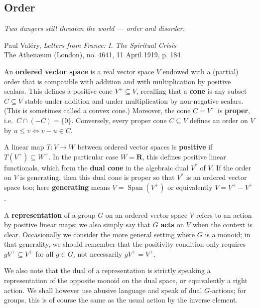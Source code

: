 \documentclass[11pt]{amsart}
\numberwithin{equation}{section}
\theoremstyle{definition}
\theoremstyle{definition}
\newcommand*{\RR}{\mathbf{R}}
\newcommand*{\se}{\subseteq}
\DeclareMathOperator{\Span}{Span}
\begin{document}
\subsection{Order}\label{sec:order}%
\begin{flushright}
\begin{minipage}[t]{0.85\linewidth}\itshape
Two dangers still threaten the world --- order and disorder.
\end{minipage}
\end{flushright}
\begin{flushright}
\begin{minipage}[t]{0.75\linewidth}\small
Paul Val{\'e}ry, \emph{Letters from France: I. The Spiritual Crisis}\\
The Athen{\ae}um (London), no. 4641, 11 April 1919, p. 184
\end{minipage}
\end{flushright}
%
An \textbf{ordered vector space} is a real vector space $V$ endowed with a (partial) order that is compatible with addition and with multiplication by positive scalars. This defines a positive cone $V^+\se V$, recalling that a \textbf{cone} is any subset $C\se V$ stable under addition and under multiplication by non-negative scalars. (This is sometimes called a convex cone.) Moreover, the cone $C=V^+$ is \textbf{proper}, i.e.\ $C \cap (- C) = \{0\}$. Conversely, every proper cone $C\se V$ defines an order on $V$ by $u\leq v \Leftrightarrow v-u\in C$.

\medskip
A linear map $T\colon V \to W$ between ordered vector spaces is \textbf{positive} if $T(V^+) \se W^+$. In the particular case $W=\RR$, this defines positive linear functionals, which form the \textbf{dual cone} in the algebraic dual $V^*$ of $V$. If the order on $V$ is generating, then this dual cone is proper so that $V^*$ is an ordered vector space too; here \textbf{generating} means $V=\Span(V^+)$ or equivalently $V=V^+ - V^+$.

\medskip
A \textbf{representation} of a group $G$ on an ordered vector space $V$ refers to an action by positive linear maps; we also simply say that $G$ \textbf{acts} on $V$ when the context is clear. Occasionally we consider the more general setting where $G$ is a monoid; in that generality, we should remember that the positivity condition only requires $g V^+ \se V^+$ for all $g\in G$, not necessarily $g V^+ =V^+$.

We also note that the dual of a representation is strictly speaking a representation of the opposite monoid on the dual space, or equivalently a right action. We shall however use abusive language and speak of dual $G$-actions; for groups, this is of course the same as the usual action by the inverse element.
\end{document}
